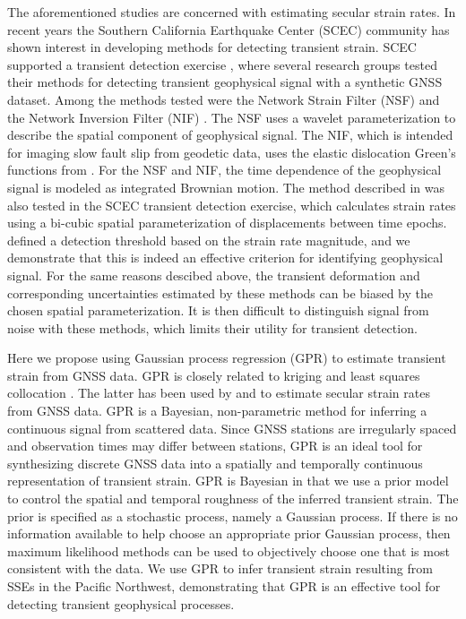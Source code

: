\documentclass[extra,mreferee]{gji}
\begin{document}
The aforementioned studies are concerned with estimating secular
strain rates. In recent years the Southern California Earthquake
Center (SCEC) community has shown interest in developing methods for
detecting transient strain. SCEC supported a transient detection
exercise \citep{Lohman2013}, where several research groups tested
their methods for detecting transient geophysical signal with a
synthetic GNSS dataset. Among the methods tested were the Network
Strain Filter (NSF) \citep{Ohtani2010} and the Network Inversion
Filter (NIF) \citep{Segall1997}. The NSF uses a wavelet
parameterization to describe the spatial component of geophysical
signal. The NIF, which is intended for imaging slow fault slip from
geodetic data, uses the elastic dislocation Green's functions from
\citet{Okada1992}. For the NSF and NIF, the time dependence of the
geophysical signal is modeled as integrated Brownian motion. The
method described in \citet{Holt2013} was also tested in the SCEC
transient detection exercise, which calculates strain rates using a
bi-cubic spatial parameterization of displacements between time
epochs. \citet{Holt2013} defined a detection threshold based on the
strain rate magnitude, and we demonstrate that this is indeed an
effective criterion for identifying geophysical signal. For the same
reasons descibed above, the transient deformation and corresponding
uncertainties estimated by these methods can be biased by the chosen
spatial parameterization. It is then difficult to distinguish signal
from noise with these methods, which limits their utility for
transient detection.


Here we propose using Gaussian process regression (GPR)
\citep{Rasmussen2006} to estimate transient strain from GNSS data. GPR
is closely related to kriging \citep{Cressie1992} and least squares
collocation \citep{Moritz1978}. The latter has been used by
\citet{Kato1998} and \citet{El-Fiky1999} to estimate secular strain
rates from GNSS data. GPR is a Bayesian, non-parametric method for
inferring a continuous signal from scattered data. Since GNSS stations
are irregularly spaced and observation times may differ between
stations, GPR is an ideal tool for synthesizing discrete GNSS data
into a spatially and temporally continuous representation of transient
strain. GPR is Bayesian in that we use a prior model to control the
spatial and temporal roughness of the inferred transient strain. The
prior is specified as a stochastic process, namely a Gaussian process.
If there is no information available to help choose an appropriate
prior Gaussian process, then maximum likelihood methods can be used to
objectively choose one that is most consistent with the data. We use
GPR to infer transient strain resulting from SSEs in the Pacific
Northwest, demonstrating that GPR is an effective tool for detecting
transient geophysical processes.
\end{document}
